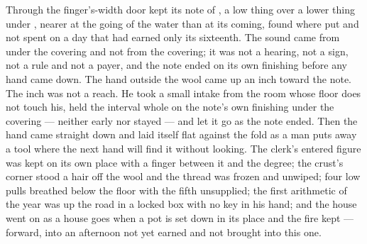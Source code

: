 Through the finger's-width door  kept its note of , a low thing over a lower thing under , nearer at the going of the water than at its coming, found where put and not spent on a day that had earned only its sixteenth. The sound came from under the covering and not from the covering; it was not a hearing, not a sign, not a rule and not a payer, and the note ended on its own finishing before any hand came down. The hand outside the wool came up an inch toward the note. The inch was not a reach. He took a small intake from the room whose floor does not touch his, held the interval whole on the note's own finishing under the covering --- neither early nor stayed --- and let it go as the note ended. Then the hand came straight down and laid itself flat against the fold as a man puts away a tool where the next hand will find it without looking. The clerk's entered figure was kept on its own place with a finger between it and the degree; the crust's corner stood a hair off the wool and the thread was frozen and unwiped; four low pulls breathed below the floor with the fifth unsupplied; the first arithmetic of the year was up the road in a locked box with no key in his hand; and the house went on as a house goes when a pot is set down in its place and the fire kept --- forward, into an afternoon not yet earned and not brought into this one.
